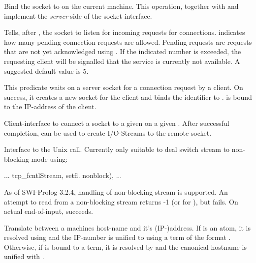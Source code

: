 \documentclass[11pt]{article}
\begin{document}
\begin{description}
Bind the socket to  on the current machine.  This operation,
together with  and  implement the {\em server}-side of
the socket interface.

Tells, after , the socket to listen for incoming requests for
connections.   indicates how many pending connection
requests are allowed.  Pending requests are requests that are not yet
acknowledged using .  If the indicated number is exceeded, the
requesting client will be signalled that the service is currently not
available.  A suggested default value is 5.

This predicate waits on a server socket for a connection request by
a client.  On success, it creates a new socket for the client and
binds the identifier to .    is bound to the
IP-address of the client.

Client-interface to connect a socket to a given  on a given
.  After successful completion,  can be used to
create I/O-Streams to the remote socket.

Interface to the Unix  call.  Currently only suitable
to deal switch stream to non-blocking mode using:

\begin{code}
        ...
        tcp_fcntlStream, setfl. nonblock),
        ...
\end{code}

\noindent
As of SWI-Prolog 3.2.4, handling of non-blocking stream is supported. An
attempt to read from a non-blocking stream returns -1 (or
 for ), but  fails. On actual
end-of-input,  succeeds.

Translate between a machines host-name and it's (IP-)address. If
 is an atom, it is resolved using
 and the IP-number is unified to 
using a term of the format .
Otherwise, if  is bound to a  term, it
is resolved by  and the canonical hostname
is unified with .
\end{description}
\end{document}
